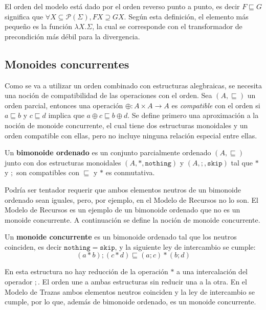 El orden del modelo está dado por el orden reverso punto a punto, es decir $F \sqsubseteq G$ significa que $\forall X \subseteq \mathcal{P}(\Sigma), FX \supseteq GX$. Según esta definición, el elemento más pequeño es la función $\lambda X.\Sigma$, la cual se corresponde con el transformador de precondición más débil para la divergencia. 

\subsection{Monoides concurrentes}\label{mc:monoid}

Como se va a utilizar un orden combinado con estructuras alegbraicas, se necesita una noción de compatibilidad de las operaciones con el orden.
Sea $(A, \sqsubseteq)$ un orden parcial, entonces una operación $\oplus : A \times A \rightarrow A$ es \textit{compatible} con el orden si $a \sqsubseteq b$ y $c \sqsubseteq d$ implica que $a \oplus c \sqsubseteq b \oplus d$. 
Se define primero una aproximación a la noción de monoide concurrente, el cual tiene dos estructuras monoidales y un orden compatible con ellas, pero no incluye ninguna relación especial entre ellas.  

\begin{definition}
Un \textbf{bimonoide ordenado} es un conjunto parcialmente ordenado $(A,\sqsubseteq)$ junto con dos estructuras monoidales $(A,*,\mathtt{nothing})$ y $(A,;,\mathtt{skip})$ tal que $*$ y $;$ son compatibles con $\sqsubseteq$ y $*$ es conmutativa.
\end{definition}

Podría ser tentador requerir que ambos elementos neutros de un bimonoide ordenado sean iguales, pero, por ejemplo, en el Modelo de Recursos no lo son. El Modelo de Recursos es un ejemplo de un bimonoide ordenado que no es un monoide concurrente. A continuación se define la noción de monoide concurrente.

\begin{definition}
Un \textbf{monoide concurrente} es un bimonoide ordenado tal que los neutros coinciden, es decir $\mathtt{nothing} = \mathtt{skip}$, y la siguiente ley de intercambio se cumple:
\begin{equation*}
(a * b) ; (c * d) \sqsubseteq (a ; c) * (b ; d)
\end{equation*}
\end{definition}

En esta estructura no hay reducción de la operación $*$ a una intercalación del operador $;$. El orden une a ambas estructuras sin reducir una a la otra. En el Modelo de Trazas ambos elementos neutros coinciden y la ley de intercambio se cumple, por lo que, además de bimonoide ordenado, es un monoide concurrente. 


